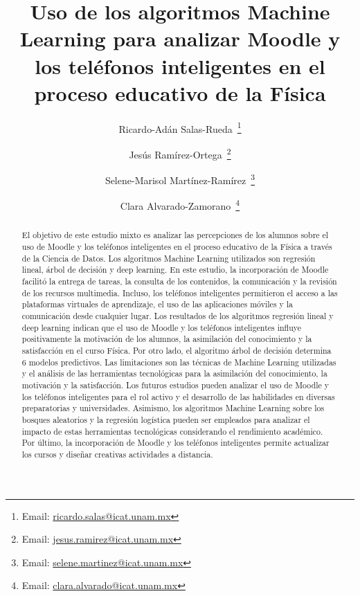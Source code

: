 \documentclass[spanish]{textolivre}
\title{Uso de los algoritmos Machine Learning para analizar Moodle y los teléfonos inteligentes en el proceso educativo de la Física}
\author[1]{Ricardo-Adán Salas-Rueda~\orcid{0000-0002-4188-4610}\thanks{Email: \href{mailto:ricardo.salas@icat.unam.mx}{ricardo.salas@icat.unam.mx}}}
\author[1]{Jesús Ramírez-Ortega~\orcid{0000-0002-4538-9203}\thanks{Email: \href{mailto:jesus.ramirez@icat.unam.mx}{jesus.ramirez@icat.unam.mx}}}
\author[1]{Selene-Marisol Martínez-Ramírez~\orcid{0000-0002-5655-0963}\thanks{Email: \href{mailto:selene.martinez@icat.unam.mx}{selene.martinez@icat.unam.mx}}}
\author[1]{Clara Alvarado-Zamorano~\orcid{0000-0001-9122-7590}\thanks{Email: \href{mailto:clara.alvarado@icat.unam.mx}{clara.alvarado@icat.unam.mx}}}
\affil[1]{Universidad Nacional Autónoma de México, Instituto de Ciencias Aplicadas y Tecnología, Ciudad de México, México.}
\begin{document}
\maketitle

\begin{polyabstract}
\begin{abstract}
El objetivo de este estudio mixto es analizar las percepciones de los alumnos sobre el uso de Moodle y los teléfonos inteligentes en el proceso educativo de la Física a través de la Ciencia de Datos. Los algoritmos Machine Learning utilizados son regresión lineal, árbol de decisión y deep learning. En este estudio, la incorporación de Moodle facilitó la entrega de tareas, la consulta de los contenidos, la comunicación y la revisión de los recursos multimedia. Incluso, los teléfonos inteligentes permitieron el acceso a las plataformas virtuales de aprendizaje, el uso de las aplicaciones móviles y la comunicación desde cualquier lugar. Los resultados de los algoritmos regresión lineal y deep learning indican que el uso de Moodle y los teléfonos inteligentes influye positivamente la motivación de los alumnos, la asimilación del conocimiento y la satisfacción en el curso Física. Por otro lado, el algoritmo árbol de decisión determina 6 modelos predictivos. Las limitaciones son las técnicas de Machine Learning utilizadas y el análisis de las herramientas tecnológicas para la asimilación del conocimiento, la motivación y la satisfacción. Los futuros estudios pueden analizar el uso de Moodle y los teléfonos inteligentes para el rol activo y el desarrollo de las habilidades en diversas preparatorias y universidades. Asimismo, los algoritmos Machine Learning sobre los bosques aleatorios y la regresión logística pueden ser empleados para analizar el impacto de estas herramientas tecnológicas considerando el rendimiento académico. Por último, la incorporación de Moodle y los teléfonos inteligentes permite actualizar los cursos y diseñar creativas actividades a distancia.

\end{abstract}


\end{polyabstract}
\end{document}
